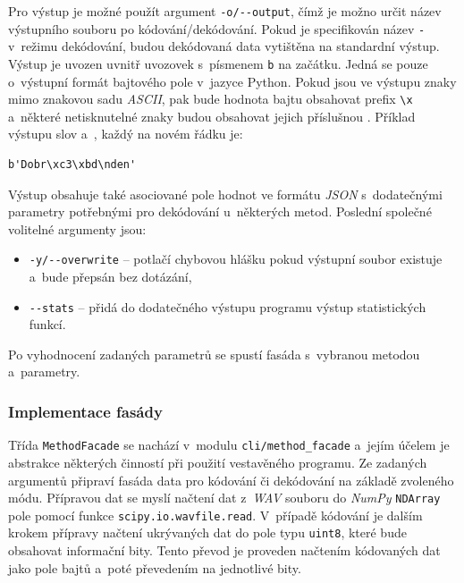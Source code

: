 Pro výstup je možné použít argument \verb|-o/--output|, čímž je možno určit
název výstupního souboru po kódování/dekódování. Pokud je specifikován název
\texttt{-} v~režimu dekódování, budou dekódovaná data vytištěna na standardní
výstup. Výstup je uvozen uvnitř uvozovek s~písmenem \texttt{b} na začátku.
Jedná se pouze o~výstupní formát bajtového pole v~jazyce Python. Pokud jsou ve
výstupu znaky mimo znakovou sadu \textit{ASCII}, pak bude hodnota bajtu
obsahovat prefix \verb|\x| a~některé netisknutelné znaky budou obsahovat jejich
příslušnou . Příklad výstupu slov  a~,
každý na novém řádku je:

\begin{verbatim}
b'Dobr\xc3\xbd\nden'
\end{verbatim}

Výstup obsahuje také asociované pole hodnot ve formátu \textit{JSON}
s~dodatečnými parametry potřebnými pro dekódování u~některých metod. Poslední
společné volitelné argumenty jsou:

\begin{itemize}
    \item \verb|-y/--overwrite| -- potlačí chybovou hlášku pokud výstupní
        soubor existuje a~bude přepsán bez dotázání,
    \item \verb|--stats| -- přidá do dodatečného výstupu programu výstup
        statistických funkcí.
\end{itemize}

Po vyhodnocení zadaných parametrů se spustí fasáda s~vybranou metodou
a~parametry.

\subsubsection*{Implementace fasády}
\label{ssub:facade-implementation}

Třída \texttt{MethodFacade} se nachází v~modulu \texttt{cli/method\_facade}
a~jejím účelem je abstrakce některých činností při použití vestavěného
programu. Ze zadaných argumentů připraví fasáda data pro kódování či dekódování
na základě zvoleného módu. Přípravou dat se myslí načtení dat z~\textit{WAV}
souboru do \textit{NumPy} \texttt{NDArray} pole pomocí funkce
\texttt{scipy.io.wavfile.read}. V~případě kódování je dalším krokem přípravy
načtení ukrývaných dat do pole typu \texttt{uint8}, které bude obsahovat
informační bity. Tento převod je proveden načtením kódovaných dat jako pole
bajtů a~poté převedením na jednotlivé bity.


